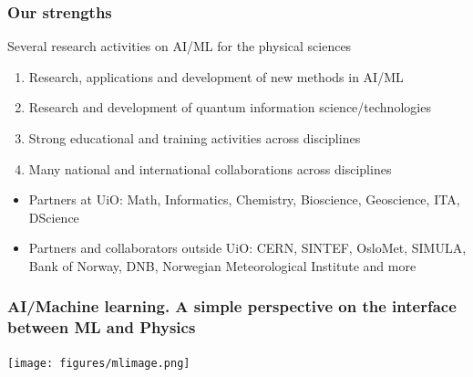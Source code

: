 \documentclass{beamer}
\begin{document}
\begin{frame}
\frametitle{Our strengths}

\begin{block}{Several research activities on AI/ML for the physical sciences }
\begin{enumerate}
\item Research, applications and development of new methods in AI/ML

\item Research and development of quantum information science/technologies

\item Strong educational and training activities across disciplines

\item Many national and international collaborations across disciplines
\end{enumerate}

\noindent
\end{block}

\begin{itemize}
\item Partners at UiO: Math, Informatics, Chemistry, Bioscience, Geoscience, ITA, DScience

\item Partners and collaborators outside UiO: CERN, SINTEF, OsloMet, SIMULA, Bank of Norway, DNB,  Norwegian Meteorological Institute and more
\end{itemize}

\noindent
\end{frame}

\begin{frame}
\frametitle{AI/Machine learning. A simple perspective on the interface between ML and Physics}

\vspace{6mm}

\centerline{\texttt{[image: figures/mlimage.png]}}

\vspace{6mm}
\end{frame}
\end{document}
